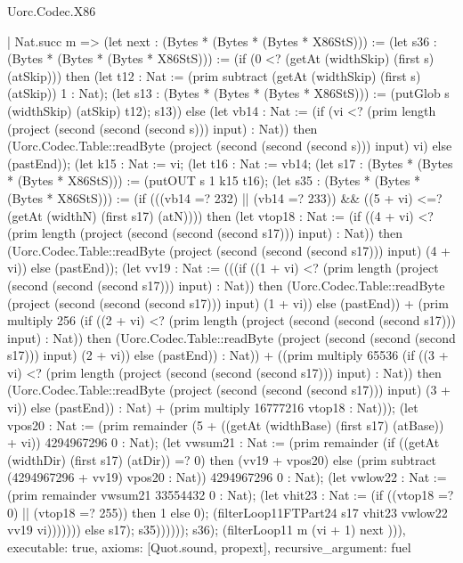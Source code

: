 \begin{lexlean}{Uorc.Codec.X86}
\begin{semanticmodule}
{    | Nat.succ m => (let next : (Bytes * (Bytes * (Bytes * X86StS))) := (let s36 : (Bytes * (Bytes * (Bytes * X86StS))) := (if (0 <? (getAt (widthSkip) (first s) (atSkip))) then (let t12 : Nat := (prim subtract (getAt (widthSkip) (first s) (atSkip)) 1 : Nat); (let s13 : (Bytes * (Bytes * (Bytes * X86StS))) := (putGlob s (widthSkip) (atSkip) t12); s13)) else (let vb14 : Nat := (if (vi <? (prim length (project (second (second (second s))) input) : Nat)) then (Uorc.Codec.Table::readByte (project (second (second (second s))) input) vi) else (pastEnd)); (let k15 : Nat := vi; (let t16 : Nat := vb14; (let s17 : (Bytes * (Bytes * (Bytes * X86StS))) := (putOUT s 1 k15 t16); (let s35 : (Bytes * (Bytes * (Bytes * X86StS))) := (if (((vb14 =? 232) || (vb14 =? 233)) && ((5 + vi) <=? (getAt (widthN) (first s17) (atN)))) then (let vtop18 : Nat := (if ((4 + vi) <? (prim length (project (second (second (second s17))) input) : Nat)) then (Uorc.Codec.Table::readByte (project (second (second (second s17))) input) (4 + vi)) else (pastEnd)); (let vv19 : Nat := (((if ((1 + vi) <? (prim length (project (second (second (second s17))) input) : Nat)) then (Uorc.Codec.Table::readByte (project (second (second (second s17))) input) (1 + vi)) else (pastEnd)) + (prim multiply 256 (if ((2 + vi) <? (prim length (project (second (second (second s17))) input) : Nat)) then (Uorc.Codec.Table::readByte (project (second (second (second s17))) input) (2 + vi)) else (pastEnd)) : Nat)) + ((prim multiply 65536 (if ((3 + vi) <? (prim length (project (second (second (second s17))) input) : Nat)) then (Uorc.Codec.Table::readByte (project (second (second (second s17))) input) (3 + vi)) else (pastEnd)) : Nat) + (prim multiply 16777216 vtop18 : Nat))); (let vpos20 : Nat := (prim remainder (5 + ((getAt (widthBase) (first s17) (atBase)) + vi)) 4294967296 0 : Nat); (let vwsum21 : Nat := (prim remainder (if ((getAt (widthDir) (first s17) (atDir)) =? 0) then (vv19 + vpos20) else (prim subtract (4294967296 + vv19) vpos20 : Nat)) 4294967296 0 : Nat); (let vwlow22 : Nat := (prim remainder vwsum21 33554432 0 : Nat); (let vhit23 : Nat := (if ((vtop18 =? 0) || (vtop18 =? 255)) then 1 else 0); (filterLoop11FTPart24 s17 vhit23 vwlow22 vv19 vi))))))) else s17); s35)))))); s36); (filterLoop11 m (vi + 1) next ))),
  executable: true,
  axioms: [Quot.sound, propext],
  recursive_argument: fuel
}


\end{semanticmodule}
\end{lexlean}
